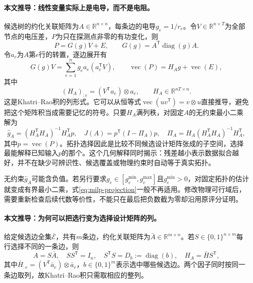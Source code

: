 \documentclass[UTF8,11pt,fontset=fandol]{ctexart}
\theoremstyle{remark}
\numberwithin{equation}{section}
\begin{document}
\paragraph{本文推导：线性变量实际上是电导，而不是电阻。}
候选树的约化关联矩阵为$A\in\mathbb R^{n\times n}$，每条边的电导$g_e=1/r_e$。令$V\in\mathbb R^{n\times T}$为全部节点的电压差，$P$为只在探测点非零的有功变化，则
\begin{equation}
 P=G(g)V+E,\qquad G(g)=A^{\mathsf T}\operatorname{diag}(g)A.
 \label{eq:milp-probe-model}
\end{equation}
令$a_e$为$A$第$e$行的转置，逐边展开有
\begin{equation}
 G(g)V=\sum_{e=1}^{n}g_ea_e(a_e^{\mathsf T}V),\qquad
 \operatorname{vec}(P)=H_Ag+\operatorname{vec}(E),
 \label{eq:milp-vectorize}
\end{equation}
其中
\begin{equation}
 (H_A)_{:e}=(V^{\mathsf T}a_e)\otimes a_e,
 \qquad H_A\in\mathbb R^{nT\times n}.
 \label{eq:milp-design}
\end{equation}
这是Khatri--Rao积的列形式。它可以从恒等式$\operatorname{vec}(uv^{\mathsf T})=v\otimes u$直接推导，避免把这个矩阵积当成需要记忆的符号。只要$H_A$满列秩，对固定$A$的无约束最小二乘解为
\begin{equation}
 \widehat g_A=(H_A^{\mathsf T}H_A)^{-1}H_A^{\mathsf T}p,
 \quad
 J(A)=p^{\mathsf T}(I-\Pi_A)p,
 \quad
 \Pi_A=H_A(H_A^{\mathsf T}H_A)^{-1}H_A^{\mathsf T},
 \label{eq:milp-projection}
\end{equation}
其中$p=\operatorname{vec}(P)$。拓扑选择因此是比较不同候选设计矩阵张成的子空间，选择最能解释已知输入$p$的那个。这个几何解释同时揭示：残差越小表示数据拟合越好，并不在缺少可辨识性、候选覆盖或物理约束时自动等于真实拓扑。

无约束$\widehat g_A$可能含负值。若另行要求$g_e\in[g_e^{\min},g_e^{\max}]$且$g_e^{\min}>0$，对固定拓扑的估计就变成有界最小二乘，式\eqref{eq:milp-projection}一般不再适用。修改物理可行域后，需要重新检查后续代数等价性，不能只在最后把负数截为零却沿用原评分证明。

\paragraph{本文推导：为何可以把选行变为选择设计矩阵的列。}
给定候选边全集$\overline{\mathcal E}$，共有$m$条边，约化关联矩阵为$\bar A\in\mathbb R^{m\times n}$。若$S\in\{0,1\}^{n\times m}$每行选择不同的一条边，则
\begin{equation}
 A=S\bar A,\quad SS^{\mathsf T}=I_n,\quad
 S^{\mathsf T}S=D_b:=\operatorname{diag}(b),\quad
 H_A=\bar H S^{\mathsf T},
 \label{eq:milp-selector}
\end{equation}
其中$\bar H_{:e}=(V^{\mathsf T}\bar a_e)\otimes\bar a_e$，$b\in\{0,1\}^m$表示选中哪些候选边。两个因子同时按同一条边取列，故Khatri--Rao积只需取相应的整列。
\end{document}
